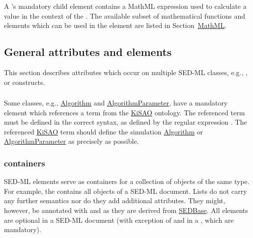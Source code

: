 \begin{blockChanged}
\subsubsection{}
\label{sec:math}
A \Calculation's mandatory child element  contains a MathML expression used to calculate a value in the context of the \Calculation.  The available subset of mathematical functions and elements which can be used in the \Math element are listed in Section~\hyperref[sec:mathML]{MathML}.


\subsection{General attributes and elements}
This section describes attributes which occur on multiple SED-ML classes, e.g., \hyperref[sec:kisaoid]{}, or \hyperref[class:listOf]{} constructs.
\label{sec:generalAttributes}

\end{blockChanged}
\subsubsection{}
\label{sec:kisaoid}
Some classes, e.g., \hyperref[class:algorithm]{Algorithm} and \hyperref[class:algorithmParameter]{AlgorithmParameter}, have a mandatory element  which references a term from the \hyperref[sec:kisao]{KiSAO} ontology. The referenced term must be defined in the correct syntax, as defined by the regular expression . The referenced \hyperref[sec:kisao]{KiSAO} term  should define the simulation \hyperref[class:algorithm]{Algorithm} or \hyperref[class:algorithmParameter]{AlgorithmParameter} as precisely as possible.


\subsubsection{ containers}
\label{class:listOf}
SED-ML  elements serve as containers for a collection of objects of the same type. For example, the \hyperref[class:listOfModels]{} contains all \Model objects of a SED-ML document. Lists do not carry any further semantics nor do they add additional attributes. They might, however, be annotated with \Notes and \Annotation as they are derived from \hyperref[class:sedBase]{SEDBase}. All  elements are optional in a SED-ML document (with exception of \hyperref[class:listOfRanges]{} and \hyperref[class:subTask]{} in a \RepeatedTask, which are mandatory).


